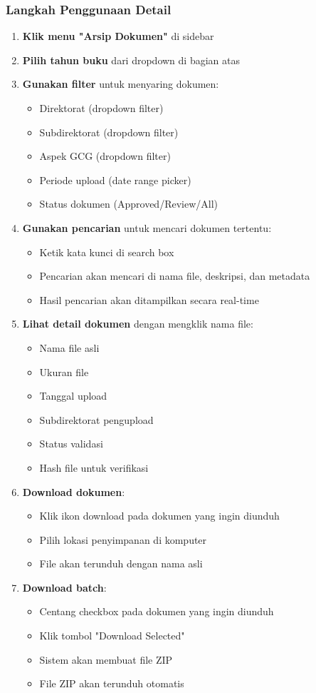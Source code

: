 \documentclass[12pt,a4paper]{article}
\begin{document}
\subsubsection{Langkah Penggunaan Detail}
\begin{enumerate}
\item \textbf{Klik menu "Arsip Dokumen"} di sidebar
\item \textbf{Pilih tahun buku} dari dropdown di bagian atas
\item \textbf{Gunakan filter} untuk menyaring dokumen:
\begin{itemize}
\item Direktorat (dropdown filter)
\item Subdirektorat (dropdown filter)
\item Aspek GCG (dropdown filter)
\item Periode upload (date range picker)
\item Status dokumen (Approved/Review/All)
\end{itemize}
\item \textbf{Gunakan pencarian} untuk mencari dokumen tertentu:
\begin{itemize}
\item Ketik kata kunci di search box
\item Pencarian akan mencari di nama file, deskripsi, dan metadata
\item Hasil pencarian akan ditampilkan secara real-time
\end{itemize}
\item \textbf{Lihat detail dokumen} dengan mengklik nama file:
\begin{itemize}
\item Nama file asli
\item Ukuran file
\item Tanggal upload
\item Subdirektorat pengupload
\item Status validasi
\item Hash file untuk verifikasi
\end{itemize}
\item \textbf{Download dokumen}:
\begin{itemize}
\item Klik ikon download pada dokumen yang ingin diunduh
\item Pilih lokasi penyimpanan di komputer
\item File akan terunduh dengan nama asli
\end{itemize}
\item \textbf{Download batch}:
\begin{itemize}
\item Centang checkbox pada dokumen yang ingin diunduh
\item Klik tombol "Download Selected"
\item Sistem akan membuat file ZIP
\item File ZIP akan terunduh otomatis
\end{itemize}
\end{enumerate}
\end{document}
